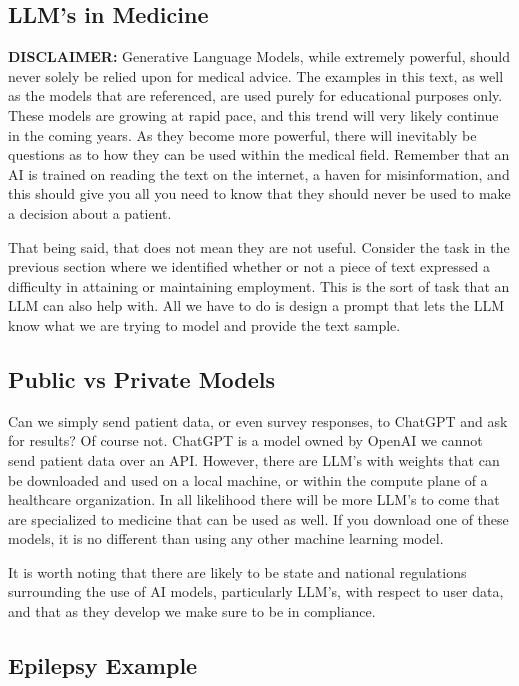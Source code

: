 \subsection{LLM's in Medicine}
\textbf{DISCLAIMER:} Generative Language Models, while extremely powerful, should never solely be relied upon for medical advice. The examples in this text,
as well as the models that are referenced, are used purely for educational purposes only.
These models are growing at rapid pace, and this trend will very likely continue in the coming years. As they become more powerful, there
will inevitably be questions as to how they can be used within the medical field. Remember that an AI is trained on reading the text on the internet,
a haven for misinformation, and this should give you all you need to know that they should never be used to make a decision about a patient.

That being said, that does not mean they are not useful. Consider the task in the previous section where we identified whether or not a piece of text
expressed a difficulty in attaining or maintaining employment. This is the sort of task that an LLM can also help with. All we have to do
is design a prompt that lets the LLM know what we are trying to model and provide the text sample.

\subsection{Public vs Private Models}

Can we simply send patient data, or even survey responses, to ChatGPT and ask for results? Of course not. ChatGPT is a model owned by OpenAI we cannot send
patient data over an API. However, there are LLM's with weights that can be downloaded and used on a local machine, or within the compute plane of a healthcare
organization. In all likelihood there will be more LLM's to come that are specialized to medicine that can be used as well. If you download one of these models,
it is no different than using any other machine learning model.

It is worth noting that there are likely to be state and national regulations surrounding the use of AI models, particularly LLM's, with respect to user data, and
that as they develop we make sure to be in compliance.

\subsection{Epilepsy Example}

